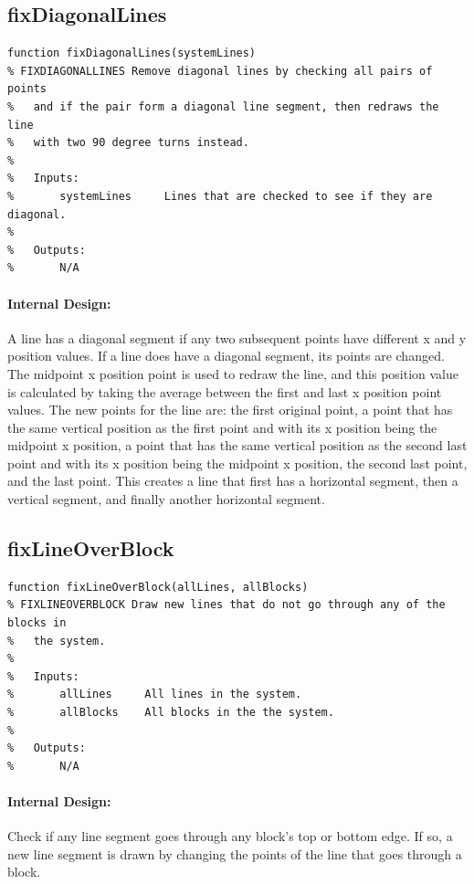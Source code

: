 \documentclass[12pt,letterpaper]{report}
\begin{document}
\subsection{fixDiagonalLines}
\begin{lstlisting}
function fixDiagonalLines(systemLines)
% FIXDIAGONALLINES Remove diagonal lines by checking all pairs of points
%   and if the pair form a diagonal line segment, then redraws the line
%   with two 90 degree turns instead.
%
%   Inputs:
%       systemLines     Lines that are checked to see if they are diagonal.
%
%   Outputs:
%       N/A
\end{lstlisting}
\paragraph{Internal Design:} A line has a diagonal segment if any two subsequent points have different x and y position values. If a line does have a diagonal segment, its points are changed. The midpoint x position point is used to redraw the line, and this position value is calculated by taking the average between the first and last x position point values. The new points for the line are: the first original point, a point that has the same vertical position as the first point and with its x position being the midpoint x position, a point that has the same vertical position as the second last point and with its x position being the midpoint x position, the second last point, and the last point. This creates a line that first has a horizontal segment, then a vertical segment, and finally another horizontal segment.

\subsection{fixLineOverBlock}
\begin{lstlisting}
function fixLineOverBlock(allLines, allBlocks)
% FIXLINEOVERBLOCK Draw new lines that do not go through any of the blocks in
%   the system.
%
%   Inputs:
%       allLines     All lines in the system.
%       allBlocks    All blocks in the the system.
%
%   Outputs:
%       N/A
\end{lstlisting}
\paragraph{Internal Design:} Check if any line segment goes through any block's top or bottom edge. If so, a new line segment is drawn by changing the points of the line that goes through a block.
\end{document}
